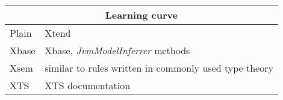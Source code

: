 \begin{frame}
\framebreak
\begin{tabularx}{\linewidth}{ l   X }
\multicolumn{2}{c}{Learning curve} \\ \hline
Plain & Xtend \\
Xbase & Xbase, \emph{JvmModelInferrer} methods \\
Xsem & similar to rules written in commonly used type theory \\
XTS & XTS documentation \\
\end{tabularx}

% 

\end{frame}
